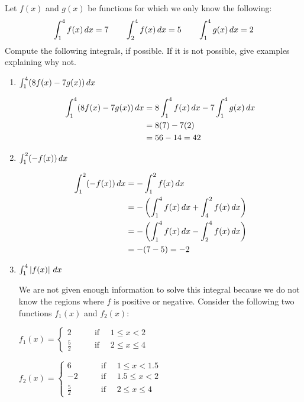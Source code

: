 \documentclass[nooutcomes]{ximera}
\begin{document}
\begin{problem}
Let $f(x)$ and $g(x)$ be functions for which we only know the following:
$$ \int_1^4 f(x)\,d x = 7	\qquad	\int_2^4 f(x)\,d x = 5	\qquad	\int_1^4 g(x)\,d x = 2 $$
Compute the following integrals, if possible.  If it is not possible, give examples explaining why not.
	\begin{enumerate}
	
	\item  $\int_1^4 (8f(x) - 7g(x))\,d x $
		\begin{freeResponse}
			\begin{align*}
			\int_1^4 (8f(x) - 7g(x))\,d x &= 8 \int_1^4 f(x) \,d x - 7 \int_1^4 g(x) \,d x  \\
			&= 8(7) - 7(2) \\
			&= 56 - 14 = 42
			\end{align*}
		\end{freeResponse}
		
		
		
	\item  $\int_1^2 (-f(x)) \,d x $
		\begin{freeResponse}
			\begin{align*}
			\int_1^2 (-f(x)) \,d x &= - \int_1^2 f(x) \,d x  \\
			&= - \left( \int_1^4 f(x)\,d x + \int_4^2 f(x)\,d x \right)  \\
			&= - \left( \int_1^4 f(x)\,d x - \int_2^4 f(x)\,d x \right)  \\
			&= - (7 - 5) = -2
			\end{align*}
		\end{freeResponse}
		
		
		
	\item  $\int_1^4 \left| f(x) \right| \,d x$
		\begin{freeResponse}
		We are not given enough information to solve this integral because we do not know the regions where $f$ is positive or negative.
		Consider the following two functions $f_1(x)$ and $f_2(x)$:  
		
		$f_1(x) =   \left\{ \begin{array}{cl}
	2		 	&	\qquad \text{if } \quad 1 \leq x < 2					\\
	\frac{5}{2}		&	\qquad \text{if } \quad 2 \leq x \leq 4		\end{array} \right.  $
	
	$f_2(x) =   \left\{ \begin{array}{cl}
	6		 	&	\qquad \text{if } \quad 1 \leq x < 1.5					\\
	-2		 	&	\qquad \text{if } \quad 1.5 \leq x < 2					\\
	\frac{5}{2}		&	\qquad \text{if } \quad 2 \leq x \leq 4		\end{array} \right.  $
	

\end{freeResponse}
\end{enumerate}
\end{problem}
\end{document}
